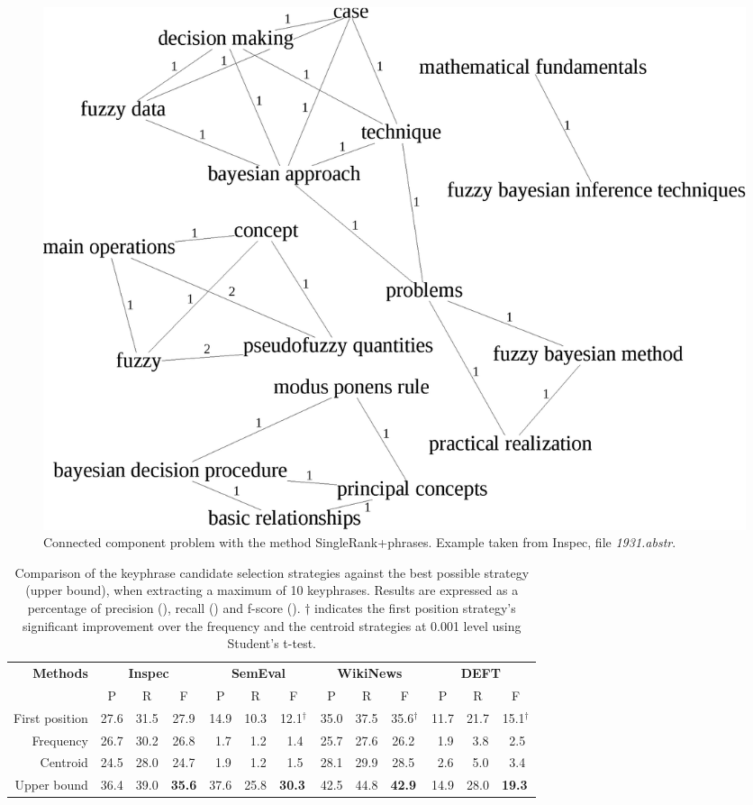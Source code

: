   \begin{figure}[h]
    \centering
    \includegraphics[width=.475\textwidth]{include/1931.eps}
    \caption{Connected component problem with the method SingleRank+phrases.
             Example taken from Inspec, file \textit{1931.abstr}.
             \label{fig:phrases_graph}}
  \end{figure}

  \begin{table}
    \centering
    \begin{tabular}{@{ }rcccccccccccc@{ }}
      \toprule
      \multirow{2}{*}[-2pt]{\textbf{Methods}} & \multicolumn{3}{c}{\textbf{Inspec}} & \multicolumn{3}{c}{\textbf{SemEval}} & \multicolumn{3}{c}{\textbf{WikiNews}} & \multicolumn{3}{c}{\textbf{DEFT}}\\
      \cmidrule(lr){2-4}\cmidrule(lr){5-7}\cmidrule(lr){8-10}\cmidrule(l){11-13}
      & P & R & F & P & R & F & P & R & F & P & R & F\\
      \midrule
      First position & 27.6 & 31.5 & 27.9  & 14.9 & 10.3 & 12.1$^\dagger$ & 35.0 & 37.5 & 35.6$^\dagger$ & 11.7 & 21.7 & 15.1$^\dagger$\\
      Frequency & 26.7 & 30.2 & 26.8 & $~~$1.7 & $~~$1.2 & $~~$1.4$^{~}$ & 25.7 & 27.6 & 26.2$^{~}$ & $~~$1.9 & $~~$3.8 & $~~$2.5$^{~}$\\
      Centroid & 24.5 & 28.0 & 24.7 & $~~$1.9 & $~~$1.2 & $~~$1.5$^{~}$ & 28.1 & 29.9 & 28.5$^{~}$ & $~~$2.6 & $~~$5.0 & $~~$3.4$^{~}$\\
      \midrule
      Upper bound & 36.4 & 39.0 & \textbf{35.6} & 37.6 & 25.8 & \textbf{30.3}$^{~}$ & 42.5 & 44.8 & \textbf{42.9}$^{~}$ & 14.9 & 28.0 & \textbf{19.3}$^{~}$\\
      \bottomrule
    \end{tabular}
    \caption{Comparison of the keyphrase candidate selection strategies against
             the best possible strategy (upper bound), when extracting a maximum
             of 10 keyphrases. Results are expressed as a percentage of
             precision (), recall () and f-score ().
             $\dagger$ indicates the first position strategy's significant
             improvement over the frequency and the centroid strategies at 0.001
             level using Student's t-test.
             \label{tab:cluster_ranking_evaluation}}
  \end{table}
  
